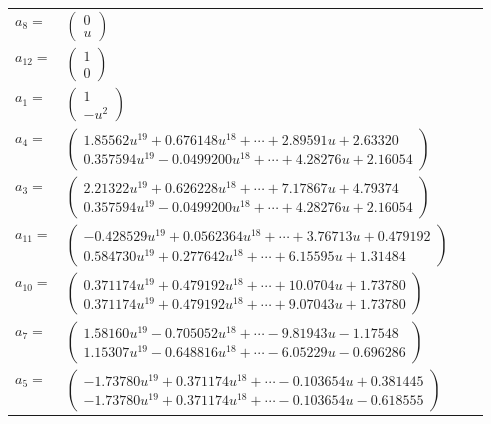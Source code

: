 \documentclass[1p]{elsarticle_modified}
\theoremstyle{definition}
\begin{document}
\begin{tabular}{m{7pt} m{180pt} m{7pt} m{180pt} }
\flushright $a_{8}=$&$\begin{pmatrix}0\\u\end{pmatrix}$ \\
\flushright $a_{12}=$&$\begin{pmatrix}1\\0\end{pmatrix}$ \\
\flushright $a_{1}=$&$\begin{pmatrix}1\\- u^2\end{pmatrix}$ \\
\flushright $a_{4}=$&$\begin{pmatrix}1.85562 u^{19}+0.676148 u^{18}+\cdots+2.89591 u+2.63320\\0.357594 u^{19}-0.0499200 u^{18}+\cdots+4.28276 u+2.16054\end{pmatrix}$ \\
\flushright $a_{3}=$&$\begin{pmatrix}2.21322 u^{19}+0.626228 u^{18}+\cdots+7.17867 u+4.79374\\0.357594 u^{19}-0.0499200 u^{18}+\cdots+4.28276 u+2.16054\end{pmatrix}$ \\
\flushright $a_{11}=$&$\begin{pmatrix}-0.428529 u^{19}+0.0562364 u^{18}+\cdots+3.76713 u+0.479192\\0.584730 u^{19}+0.277642 u^{18}+\cdots+6.15595 u+1.31484\end{pmatrix}$ \\
\flushright $a_{10}=$&$\begin{pmatrix}0.371174 u^{19}+0.479192 u^{18}+\cdots+10.0704 u+1.73780\\0.371174 u^{19}+0.479192 u^{18}+\cdots+9.07043 u+1.73780\end{pmatrix}$ \\
\flushright $a_{7}=$&$\begin{pmatrix}1.58160 u^{19}-0.705052 u^{18}+\cdots-9.81943 u-1.17548\\1.15307 u^{19}-0.648816 u^{18}+\cdots-6.05229 u-0.696286\end{pmatrix}$ \\
\flushright $a_{5}=$&$\begin{pmatrix}-1.73780 u^{19}+0.371174 u^{18}+\cdots-0.103654 u+0.381445\\-1.73780 u^{19}+0.371174 u^{18}+\cdots-0.103654 u-0.618555\end{pmatrix}$ \\

\end{tabular}
\end{document}
